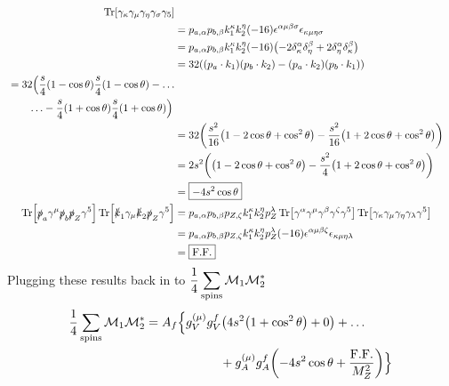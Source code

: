 \documentclass[12 pt,draft]{article}
\renewcommand{\b}[1]{\overline{#1}}
\begin{document}
\begin{problem}[ $\mu\b{\mu}\rightarrow f\b{f}$]
\begin{align}
			\Tr[\gamma_\kappa\gamma_\mu \gamma_\eta \gamma_\sigma\gamma_5]
			\\
			&=p_{a,\alpha}p_{b,\beta}k_{1}^{\kappa}k_{2}^{\eta}(-16)
			\epsilon^{\alpha\mu\beta\sigma}
			\epsilon_{\kappa\mu\eta\sigma}
			\\
			&=p_{a,\alpha}p_{b,\beta}k_{1}^{\kappa}k_{2}^{\eta}(-16)
			\qty(
				-2\delta_{\kappa}^{\alpha}\delta_{\eta}^{\beta}
				+2\delta_{\eta}^{\alpha}\delta_{\kappa}^{\beta})
			\\
			&=32\qty(
				\qty(p_a\cdot k_1)\qty(p_b\cdot k_2)
				-\qty(p_a\cdot k_2)\qty(p_b\cdot k_1))
			\\
			\begin{split}
				&=32\Big(
					\oo[s]{4}\qty(1-\cos\theta)\oo[s]{4}\qty(1-\cos\theta)
					-\ldots\\&\qquad\ldots
					-\oo[s]{4}\qty(1+\cos\theta)\oo[s]{4}\qty(1+\cos\theta)
					\Big)
			\end{split}
			\\
			&=32\qty(
				\oo[s^2]{16}\qty(1-2\cos\theta+\cos^2\theta)
				-\oo[s^2]{16}\qty(1+2\cos\theta+\cos^2\theta)
				)
			\\
			&=2s^2\qty(
				\qty(1-2\cos\theta+\cos^2\theta)
				-\oo[s^2]{4}\qty(1+2\cos\theta+\cos^2\theta)
				)
			\\
			&=\boxed{-4s^2\cos\theta}
			\\
			\Tr[\slsh{p}_a\gamma^\mu \slsh{p}_b\slsh{p}_Z\gamma^5]
			\Tr[\slsh{k}_1\gamma_\mu \slsh{k}_2\slsh{p}_Z\gamma^5]
			&=
			p_{a,\alpha}p_{b,\beta}p_{Z,\zeta}k_{1}^{\kappa}k_{2}^{\eta}p_Z^{\lambda}
			\Tr[\gamma^\alpha\gamma^\mu \gamma^\beta \gamma^\zeta\gamma^5]
			\Tr[\gamma_\kappa\gamma_\mu \gamma_\eta \gamma_\lambda\gamma^5]
			\\
			&=
			p_{a,\alpha}p_{b,\beta}p_{Z,\zeta}k_{1}^{\kappa}k_{2}^{\eta}p_Z^{\lambda}
			(-16)
			\epsilon^{\alpha\mu\beta\zeta}
			\epsilon_{\kappa\mu\eta\lambda}
			\\
			&=\boxed{\FF}
		\end{align}
		Plugging these results back in to $\displaystyle \oo{4}\sum_\text{spins}\mathcal{M}_1\mathcal{M}_2^*$
		\begin{align}
			\begin{split}
				\oo{4}\sum_\text{spins}\mathcal{M}_1\mathcal{M}_2^*&=A_f
				\Big\{
					g_V^{(\mu)}g_V^f
					\qty(4s^2\qty(1+\cos^2\theta)+0)
					+\ldots\\&\qquad\qquad\qquad+
					g_A^{(\mu)}g_A^f\qty(-4s^2\cos\theta+\oo[\FF]{M_Z^2})
				\Big\}
			\end{split}

\end{align}
\end{problem}
\end{document}
